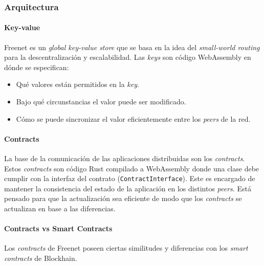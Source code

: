 \subsubsection{Arquitectura}

\paragraph{Key-value}

Freenet es un \textit{global key-value store} que se basa en la idea del \textit{small-world routing}\cite{freenet-small-world-routing} para la descentralización y escalabilidad. Las \textit{keys} son código WebAssembly en dónde se especifican:

\begin{itemize}
    \item Qué valores están permitidos en la \textit{key}.
    \item Bajo qué circunstancias el valor puede ser modificado.
    \item Cómo se puede sincronizar el valor eficientemente entre los \textit{peers} de la red.
\end{itemize}

\paragraph{Contracts}

La base de la comunicación de las aplicaciones distribuidas son los \textit{contracts}. Estos \textit{contracts} son código Rust compilado a WebAssembly donde una clase debe cumplir con la interfaz del contrato (\texttt{ContractInterface}). Este es encargado de mantener la consistencia del estado de la aplicación en los distintos \textit{peers}. Está pensado para que la actualización sea eficiente de modo que los \textit{contracts} se actualizan en base a las diferencias.

\paragraph{Contracts vs Smart Contracts}

Los \textit{contracts} de Freenet poseen ciertas similitudes y diferencias con los \textit{smart contracts} de Blockhain.

